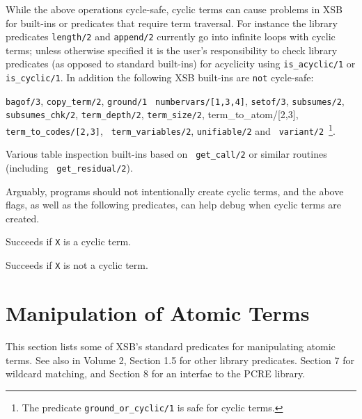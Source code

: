     While the above operations cycle-safe, cyclic terms can cause
    problems in XSB for built-ins or predicates that require term
    traversal.  For instance the library predicates {\tt length/2} and
    {\tt append/2} currently go into infinite loops with cyclic terms;
    unless otherwise specified it is the user's responsibility to
    check library predicates (as opposed to standard built-ins) for
    acyclicity using {\tt is\_acyclic/1} or {\tt is\_cyclic/1}.  In
    addition the following XSB built-ins are {\tt not} cycle-safe:

\bi
\item {\tt bagof/3}, {\tt copy\_term/2}, {\tt ground/1} {\tt
  numbervars/[1,3,4]}, {\tt setof/3}, {\tt subsumes/2}, {\tt
  subsumes\_chk/2}, {\tt term\_depth/2}, {\tt term\_size/2},
  {term\_to\_atom/[2,3]}, {\tt term\_to\_codes/[2,3]}, {\tt
    term\_variables/2}, {\tt unifiable/2} and {\tt
    variant/2}~\footnote{The predicate {\tt ground\_or\_cyclic/1} is
      safe for cyclic terms.}.
%
\item Various table inspection built-ins based on {\tt
        get\_call/2} or similar routines (including {\tt
        get\_residual/2}).
\ei

    Arguably, programs should not intentionally create cyclic terms,
    and the above flags, as well as the following predicates, can help
    debug when cyclic terms are created.

\begin{description}
    Succeeds if {\tt X} is a cyclic term.  
\end{description}

\begin{description}
    Succeeds if {\tt X} is not a cyclic term.  
\end{description}

\section{Manipulation of Atomic Terms}

This section lists some of XSB's standard predicates for manipulating
atomic terms.  See also in Volume 2, Section 1.5 for other library
predicates. Section 7 for wildcard matching, and Section 8 for an
interfae to the PCRE library.

